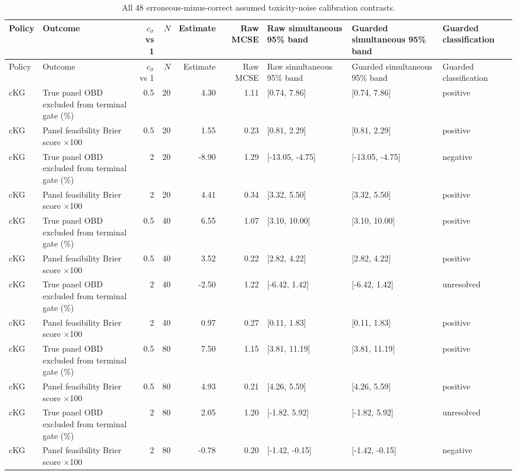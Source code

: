 \begin{longtable}{p{1.8cm}p{3.0cm}rrrrp{2.6cm}p{2.6cm}p{1.6cm}}
\caption{All 48 erroneous-minus-correct assumed toxicity-noise calibration contrasts.}\label{tab:budget-toxicity-calibration-family-b}\\
\toprule
Policy & Outcome & $c_\sigma$ vs 1 & $N$ & Estimate & Raw MCSE & Raw simultaneous 95\% band & Guarded simultaneous 95\% band & Guarded classification \\
\midrule
\endfirsthead
\toprule
Policy & Outcome & $c_\sigma$ vs 1 & $N$ & Estimate & Raw MCSE & Raw simultaneous 95\% band & Guarded simultaneous 95\% band & Guarded classification \\
\midrule
\endhead
cKG & True panel OBD excluded from terminal gate (\%) & 0.5 & 20 & 4.30 & 1.11 & [0.74, 7.86] & [0.74, 7.86] & positive \\
cKG & Panel feasibility Brier score $\times$100 & 0.5 & 20 & 1.55 & 0.23 & [0.81, 2.29] & [0.81, 2.29] & positive \\
cKG & True panel OBD excluded from terminal gate (\%) & 2 & 20 & -8.90 & 1.29 & [-13.05, -4.75] & [-13.05, -4.75] & negative \\
cKG & Panel feasibility Brier score $\times$100 & 2 & 20 & 4.41 & 0.34 & [3.32, 5.50] & [3.32, 5.50] & positive \\
cKG & True panel OBD excluded from terminal gate (\%) & 0.5 & 40 & 6.55 & 1.07 & [3.10, 10.00] & [3.10, 10.00] & positive \\
cKG & Panel feasibility Brier score $\times$100 & 0.5 & 40 & 3.52 & 0.22 & [2.82, 4.22] & [2.82, 4.22] & positive \\
cKG & True panel OBD excluded from terminal gate (\%) & 2 & 40 & -2.50 & 1.22 & [-6.42, 1.42] & [-6.42, 1.42] & unresolved \\
cKG & Panel feasibility Brier score $\times$100 & 2 & 40 & 0.97 & 0.27 & [0.11, 1.83] & [0.11, 1.83] & positive \\
cKG & True panel OBD excluded from terminal gate (\%) & 0.5 & 80 & 7.50 & 1.15 & [3.81, 11.19] & [3.81, 11.19] & positive \\
cKG & Panel feasibility Brier score $\times$100 & 0.5 & 80 & 4.93 & 0.21 & [4.26, 5.59] & [4.26, 5.59] & positive \\
cKG & True panel OBD excluded from terminal gate (\%) & 2 & 80 & 2.05 & 1.20 & [-1.82, 5.92] & [-1.82, 5.92] & unresolved \\
cKG & Panel feasibility Brier score $\times$100 & 2 & 80 & -0.78 & 0.20 & [-1.42, -0.15] & [-1.42, -0.15] & negative \\

\end{longtable}
